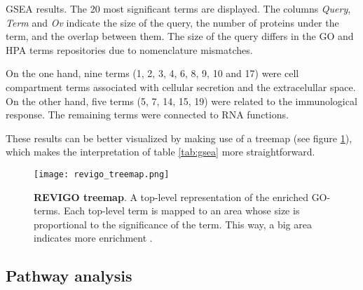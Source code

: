 \begin{table}[!h]
\caption{\ac{GSEA} results. The 20 most significant terms are displayed. The columns \textit{Query}, \textit{Term} and \textit{Ov} indicate the size of the query, the number of proteins under the term, and the overlap between them. The size of the query differs in the GO and HPA terms repositories due to nomenclature mismatches.}
\label{tab:gsea}
\end{table}
\normalsize

On the one hand, nine terms (1, 2, 3, 4, 6, 8, 9, 10 and 17) were cell compartment terms associated with cellular secretion and the extracelullar space. On the other hand, five terms (5, 7, 14, 15, 19) were related to the immunological response. The remaining terms were connected to RNA functions.

These results can be better visualized by making use of a treemap (see figure \ref{fig:treemap}), which makes the interpretation of table \ref{tab:gsea} more straightforward.

\begin{figure}[!h]
\texttt{[image: revigo\_treemap.png]}
\caption[REVIGO treemap]{\textbf{REVIGO treemap}. A top-level representation of the enriched GO-terms. Each top-level term is mapped to an area whose size is proportional to the significance of the term. This way, a big area indicates more enrichment \cite{Supek2011}.}
\label{fig:treemap}
\end{figure}

\subsection{Pathway analysis}

